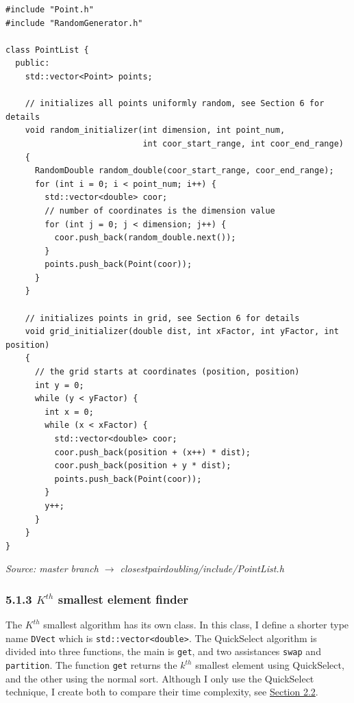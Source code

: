 \documentclass[12pt,english,]{article}
\newcommand{\code}[1]{\colorbox{light-gray}{\texttt{#1}}}
\begin{document}
\begin{lstlisting}
#include "Point.h"
#include "RandomGenerator.h"

class PointList {
  public:
    std::vector<Point> points;

    // initializes all points uniformly random, see Section 6 for details 
    void random_initializer(int dimension, int point_num,
                            int coor_start_range, int coor_end_range)
    {
      RandomDouble random_double(coor_start_range, coor_end_range);
      for (int i = 0; i < point_num; i++) {
        std::vector<double> coor;
        // number of coordinates is the dimension value
        for (int j = 0; j < dimension; j++) {
          coor.push_back(random_double.next());
        }
        points.push_back(Point(coor));
      }
    }

    // initializes points in grid, see Section 6 for details 
    void grid_initializer(double dist, int xFactor, int yFactor, int position)
    {
      // the grid starts at coordinates (position, position)
      int y = 0;
      while (y < yFactor) {
        int x = 0;
        while (x < xFactor) {
          std::vector<double> coor;
          coor.push_back(position + (x++) * dist);
          coor.push_back(position + y * dist);
          points.push_back(Point(coor));
        }
        y++;
      }
    }
}
\end{lstlisting}
\vspace{-9truemm}
\begin{minipage}{1\textwidth}
  \begin{flushright}
  {\footnotesize \emph{Source: master branch $\rightarrow$ closestpairdoubling/include/PointList.h}\par}
  \end{flushright}
\end{minipage}

\hypertarget{section5.1.3}{%
\subsubsection{\texorpdfstring{5.1.3 \(K^{th}\) smallest element
finder}{5.1.3 K\^{}\{th\} smallest element finder}}\label{section5.1.3}}

The \(K^{th}\) smallest algorithm has its own class. In this class, I
define a shorter type name \code{DVect} which is
\code{std::vector<double>}. The QuickSelect algorithm is divided into
three functions, the main is \code{get}, and two assistances \code{swap}
and \code{partition}. The function \code{get} returns the \(k^{th}\)
smallest element using QuickSelect, and the other using the normal sort.
Although I only use the QuickSelect technique, I create both to compare
their time complexity, see \protect\hyperlink{section2.2}{Section 2.2}.
\end{document}

